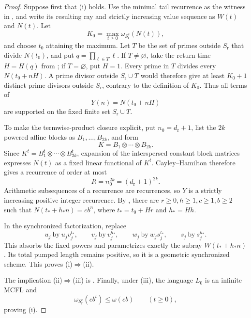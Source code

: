 \begin{proof}
  Suppose first that \textup{(i)} holds. Use the minimal tail recurrence
  as the witness in
  , and write its resulting
  ray and strictly increasing value sequence as \(W(t)\) and \(N(t)\).
  Let
  \[
    K_0=\max_{t\ge0}\omega_{S_{\mathrm r}^c}(N(t)),
  \]
  and choose \(t_0\) attaining the maximum. Let \(T\) be the set of
  primes outside \(S_{\mathrm r}\) that divide \(N(t_0)\), and put
  \(q=\prod_{\ell\in T}\ell\). If \(T\ne\varnothing\), take the return
  time \(H=H(q)\) from
  ; if \(T=\varnothing\),
  put \(H=1\). Every prime in \(T\) divides every \(N(t_0+nH)\). A prime
  divisor outside \(S_{\mathrm r}\cup T\) would therefore give at least
  \(K_0+1\) distinct prime divisors outside \(S_{\mathrm r}\), contrary
  to the definition of \(K_0\). Thus all terms of
  \[
    Y(n)=N(t_0+nH)
  \]
  are supported on the fixed finite set \(S_{\mathrm r}\cup T\).

  To make the termwise-product closure explicit, put
  \(n_0=d_{\mathrm r}+1\), list the \(2k\) powered affine blocks as
  \(B_1,\ldots,B_{2k}\), and form
  \[
    K=B_1\otimes\cdots\otimes B_{2k}.
  \]
  Since \(K^t=B_1^t\otimes\cdots\otimes B_{2k}^t\), expansion of the
  interspersed constant block matrices expresses \(N(t)\) as a fixed
  linear functional of \(K^t\). Cayley--Hamilton therefore gives a
  recurrence of order at most
  \[
    R=n_0^{2k}=(d_{\mathrm r}+1)^{2k}.
  \]
  Arithmetic subsequences of a recurrence are recurrences, so \(Y\) is a
  strictly increasing positive integer recurrence. By
  , there are
  \(r\ge0,h\ge1,c\ge1,b\ge2\) such that
  \(N(t_\ast+h_\ast n)=cb^n\), where
  \(t_\ast=t_0+Hr\) and \(h_\ast=Hh\).

  In the synchronized factorization, replace
  \[
    u_j\ \text{by}\ u_jv_j^{t_\ast},\qquad
    v_j\ \text{by}\ v_j^{h_\ast},\qquad
    w_j\ \text{by}\ w_js_j^{t_\ast},\qquad
    s_j\ \text{by}\ s_j^{h_\ast}.
  \]
  This absorbs the fixed powers and parametrizes exactly the subray
  \(W(t_\ast+h_\ast n)\). Its total pumped length remains positive, so
  it is a geometric synchronized scheme. This proves
  \textup{(i)}\(\Rightarrow\)\textup{(ii)}.

  The implication \textup{(ii)}\(\Rightarrow\)\textup{(iii)} is
  . Finally, under
  \textup{(iii)}, the language \(L_0\) is an infinite MCFL and
  \[
    \omega_{S_{\mathrm r}^c}(cb^t)\le\omega(cb)
    \qquad(t\ge0),
  \]
  proving \textup{(i)}.
\end{proof}

